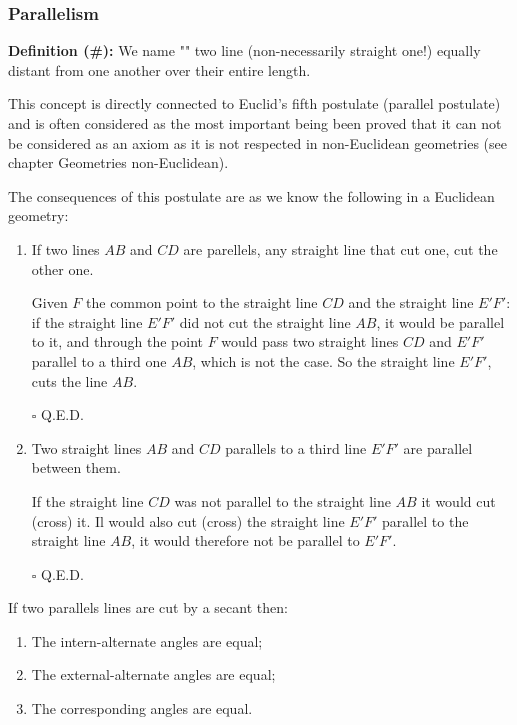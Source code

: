 	\pagebreak
	\subsubsection{Parallelism}
	\textbf{Definition (\#\mydef):} We name "" two line (non-necessarily straight one!) equally distant from one another over their entire length.

	This concept is directly connected to Euclid's fifth postulate (parallel postulate) and is often considered as the most important being been proved that it can not be considered as an axiom as it is not respected in non-Euclidean geometries (see chapter Geometries non-Euclidean).
	
	The consequences of this postulate 	are as we know the following in a Euclidean geometry:
	\begin{enumerate}
		\item If two lines $AB$ and $CD$ are parellels, any straight line that cut one, cut the other one.
		\begin{dem}
		Given $F$ the common point to the straight line $CD$ and the straight line $E'F'$: if the straight line $E'F'$ did not cut the straight line $AB$, it would be parallel to it, and through the point $F$ would pass two straight lines $CD$ and $E'F'$ parallel to a third one $AB$, which is not the case. So the straight line $E'F'$, cuts the line $AB$.
		\begin{flushright}
			$\square$  Q.E.D.
		\end{flushright}
		\end{dem}

		\item Two straight lines $AB$ and $CD$ parallels to a third line $E'F'$ are parallel between them.
		\begin{dem}
		If the straight line $CD$ was not parallel to the straight line $AB$ it would cut (cross) it. Il would also cut (cross) the straight line $E'F '$ parallel to the straight line $AB$, it would therefore not be parallel to $E 'F'$.
		\begin{flushright}
			$\square$  Q.E.D.
		\end{flushright}
		\end{dem}
	\end{enumerate}
	\begin{theorem}
	If two parallels lines are cut by a secant then:
	\begin{enumerate}
		\item The intern-alternate angles are equal;
		\item The external-alternate angles are equal;
		\item The corresponding angles are equal.
	\end{enumerate}
	\end{theorem}
